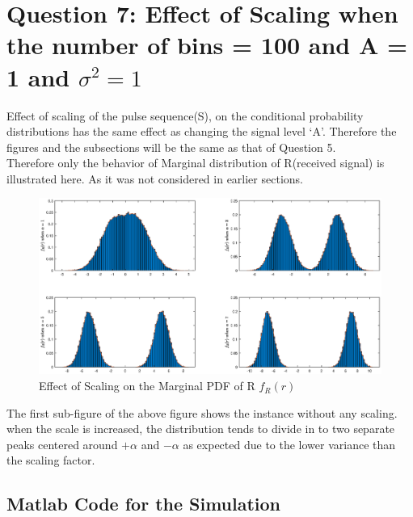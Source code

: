 \documentclass[a4paper,11pt]{article}%
\begin{document}
\section{Question 7: Effect of Scaling when the number of bins = 100 and A = 1 and $\sigma^2 = 1$}

Effect of scaling of the pulse sequence(S), on the conditional probability distributions has the same effect as changing the signal level `A'. Therefore the figures and the subsections will be the same as that of Question 5.\\

Therefore only the behavior of Marginal distribution of R(received signal) is illustrated here. As it was not considered in earlier sections.

\begin{figure}[!h]
	\centering
	\includegraphics[scale=0.45]{figures/q7f1}
	\caption{Effect of Scaling on the Marginal PDF of R $f_R(r)$}
\end{figure}

The first sub-figure of the above figure shows the instance without any scaling. when the scale is increased, the distribution tends to divide in to two separate peaks centered around $+\alpha$ and $-\alpha$ as expected due to the lower variance than the scaling factor.

\begin{appendices}
	\section{Matlab Code for the Simulation}
	
\end{appendices}



\end{document}
